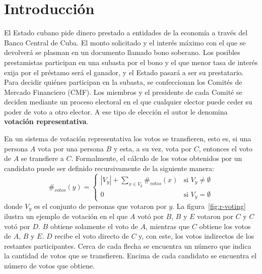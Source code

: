 \chapter*{Introducción}\label{chapter:introduction}



El Estado cubano pide dinero prestado a entidades de la econom\'ia a trav\'es del Banco Central de Cuba. El monto solicitado y el inter\'es m\'aximo con el que se devolver\'a se plasman en un documento llamado bono soberano.  Los posibles prestamistas participan en una subasta por el bono y el que menor tasa de inter\'es exija por el pr\'estamo ser\'a el ganador, y el Estado pasar\'a a ser su prestatario.  Para decidir qui\'enes participan en la subasta, se confeccionan los Comit\'es de Mercado Financiero (CMF).  Los miembros y el presidente de cada Comit\'e se deciden mediante un proceso electoral en el que cualquier elector puede ceder su poder de voto a otro elector. A ese tipo de elecci\'on el autor le denomina \textbf{votaci\'on representativa}.  


En un sistema de votaci\'on representativa  los votos se transfieren, esto es, si una persona $A$ vota por una persona $B$ y esta, a su vez, vota por  $C$, entonces el voto de $A$ se transfiere a $C$. Formalmente, el c\'alculo de los votos obtenidos por un candidato puede ser definido recursivamente de la siguiente manera:
\begin{equation}\label{eq:votes-count}
    \#_{votos}(y) = \begin{cases}
        |V_y| + \underset{x \in V_y}{\sum} \#_{votos}(x) & \text{si } V_y \neq \emptyset \\
        0 & \text{si } V_y = \emptyset 
    \end{cases}
\end{equation}
donde $V_y$ es el conjunto de personas que votaron por $y$. La figura~\ref{fig:r-voting} ilustra un ejemplo de votación en el que $A$ votó por $B$, $B$ y $E$ votaron por $C$ y $C$ votó por $D$. $B$ obtiene solamente el voto de $A$, mientras que $C$ obtiene los votos de $A$, $B$ y $E$. $D$ recibe el voto directo de $C$ y, con este,  los votos indirectos de los restantes participantes. Cerca de cada flecha se encuentra un n\'umero que indica la cantidad de votos que se transfieren. Encima de cada candidato se encuentra el n\'umero de votos que obtiene.

